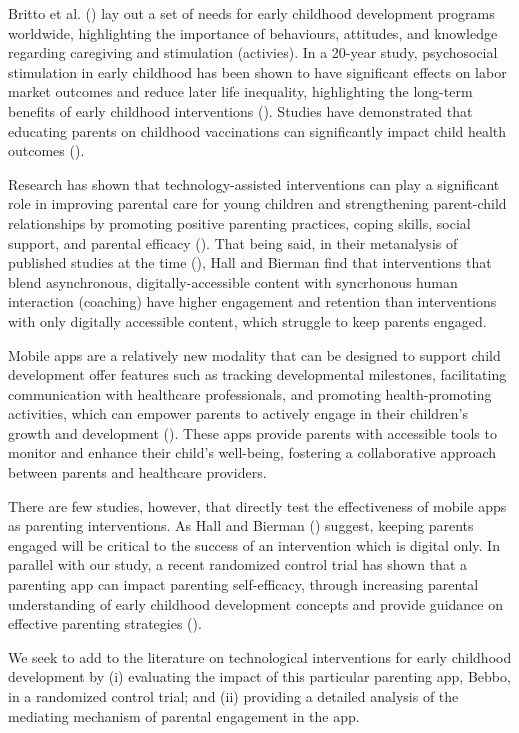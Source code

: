 \documentclass{article}
\begin{document}
Britto et al. (\parencite*{Britto2017}) lay out a set of needs for early childhood development programs worldwide, highlighting the importance of behaviours, attitudes, and knowledge regarding caregiving and stimulation (activies). In a 20-year study, psychosocial stimulation in early childhood has been shown to have significant effects on labor market outcomes and reduce later life inequality, highlighting the long-term benefits of early childhood interventions (\cite{Gertler2015}). Studies have demonstrated that educating parents on childhood vaccinations can significantly impact child health outcomes (\cite{Lukusa2018}).

Research has shown that technology-assisted interventions can play a significant role in improving parental care for young children and strengthening parent-child relationships by promoting positive parenting practices, coping skills, social support, and parental efficacy (\cite{Hall2015}). That being said, in their metanalysis of published studies at the time (\parencite*{Hall2015}), Hall and Bierman find that interventions that blend asynchronous, digitally-accessible content with syncrhonous human interaction (coaching) have higher engagement and retention than interventions with only digitally accessible content, which struggle to keep parents engaged.

 Mobile apps are a relatively new modality that can be designed to support child development offer features such as tracking developmental milestones, facilitating communication with healthcare professionals, and promoting health-promoting activities, which can empower parents to actively engage in their children's growth and development (\cite{Dewitt2022}). These apps provide parents with accessible tools to monitor and enhance their child's well-being, fostering a collaborative approach between parents and healthcare providers.

There are few studies, however, that directly test the effectiveness of mobile apps as parenting interventions. As Hall and Bierman (\parencite*{Hall2015}) suggest, keeping parents engaged will be critical to the success of an intervention which is digital only. In parallel with our study, a recent randomized control trial has shown that a parenting app can impact parenting self-efficacy, through increasing parental understanding of early childhood development concepts and provide guidance on effective parenting strategies (\cite{Outhwaite2023}).

We seek to add to the literature on technological interventions for early childhood development by (i) evaluating the impact of this particular parenting app, Bebbo, in a randomized control trial; and (ii) providing a detailed analysis of the mediating mechanism of parental engagement in the app.
\end{document}
